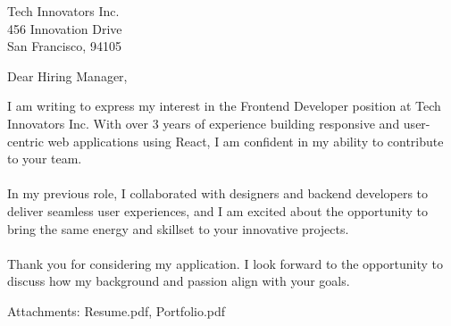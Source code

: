 \documentclass[11pt,a4paper]{letter}
\begin{document}
\begin{letter}{
Tech Innovators Inc.\\
456 Innovation Drive\\
San Francisco, 94105
}

\address{
John Doe\\
123 Main Street\\
New York, 10001\\
+1234567890\\
\href{mailto:john.doe@example.com}{john.doe@example.com}
}

\date{April 15, 2025}

\opening{Dear Hiring Manager,}

I am writing to express my interest in the Frontend Developer position at Tech Innovators Inc. With over 3 years of experience building responsive and user-centric web applications using React, I am confident in my ability to contribute to your team.\\
\\
In my previous role, I collaborated with designers and backend developers to deliver seamless user experiences, and I am excited about the opportunity to bring the same energy and skillset to your innovative projects.\\
\\
Thank you for considering my application. I look forward to the opportunity to discuss how my background and passion align with your goals.

\vspace{\baselineskip}
\noindent Attachments: Resume.pdf, Portfolio.pdf


\end{letter}
\end{document}
